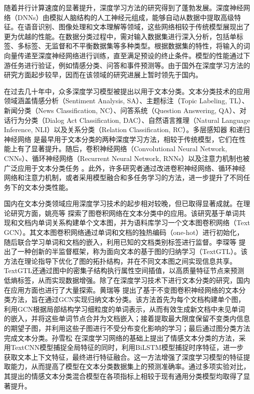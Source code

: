 随着并行计算速度的显著提升，深度学习方法的研究得到了蓬勃发展。深度神经网络（DNNs）由模拟人脑结构的人工神经元组成，能够自动从数据中提取高级特征。在语音识别、图像处理和文本理解等领域，这些网络相较于传统模型展现出了更为优越的性能。在数据分类过程中，需对输入数据集进行深入分析，包括单标签、多标签、无监督和不平衡数据集等多种类型。根据数据集的特性，将输入的词向量传递至深度神经网络进行训练，直至满足预设的终止条件。模型的性能通过下游任务进行验证，例如情感分类、问答和事件预测等。由于国外在深度学习方法的研究方面起步较早，因而在该领域的研究进展上暂时领先于国内。

在过去几十年中，众多深度学习模型被提出以用于文本分类。文本分类技术的应用领域涵盖情感分析（Sentiment Analysis, SA）、主题标注（Topic Labeling, TL）、新闻分类（News Classification, NC）、问答系统（Question Answering, QA）、对话行为分类（Dialog Act Classification, DAC）、自然语言推理（Natural Language Inference, NLI）以及关系分类（Relation Classification, RC）。多层感知器 \cite{Alsmadi2009PerformanceCO} 和递归神经网络 \cite{10.1145/3234150} 是最早用于文本分类的两种深度学习方法，相较于传统模型，它们在性能上有了显著提升。随后，卷积神经网络（Convolutional Neural Network, CNNs）、循环神经网络（Recurrent Neural Network, RNNs）以及注意力机制也被广泛应用于文本分类任务 \cite{Zhao2018InvestigatingCN, Qin2020DCRNetAD, Deng2021HTCInfoMaxAG}。此外，许多研究者通过改进卷积神经网络、循环神经网络和注意力机制，或者采用模型融合和多任务学习的方法，进一步提升了不同任务下的文本分类性能。

国内在文本分类领域应用深度学习技术的起步相对较晚，但已取得显著成就。在理论研究方面，姚亮等 \cite{Yao2018GraphCN} 探索了图卷积网络在文本分类中的应用。该研究基于单词共现和文档内单词关系构建单个文本图，并为语料库学习一个文本图卷积网络（Text GCN）。其文本图卷积网络通过单词和文档的独热编码（one-hot）进行初始化，随后联合学习单词和文档的嵌入，利用已知的文档类别标签进行监督。李琛等 \cite{Li2021TextGTLGT} 提出了一种创新的半监督框架，称为面向文本的基于图的归纳学习（TextGTL）。该方法在理论指导下优化了图的拓扑结构，并在不同文本图之间实现信息共享。TextGTL还通过图中的密集子结构执行属性空间插值，以高质量特征节点来预测低熵标签，从而实现数据增强。除了在深度学习技术下进行文本分类的研究，国内在应用方面也进行了大量探索。黄瑞等 \cite{JSJA2024S1014} 提出了基于不变图卷积神经网络的文本分类方法，旨在通过GCN实现归纳文本分类。该方法首先为每个文档构建单个图，利用GCN根据局部结构学习细粒度的单词表示，从而有效生成新文档中未见单词的嵌入，并将这些单词节点合并为文档嵌入；接着提取最大限度保留不变类内信息的期望子图，并利用这些子图进行不受分布变化影响的学习；最后通过图分类方法完成文本分类。孙雪松 \cite{1024533250.nh} 在深度学习网络的基础上提出了情感文本分类的方法，采用TextCNN模型捕捉全局特征的同时，利用BiLSTM模型捕捉时序特征，进一步获取文本上下文特征，最终进行特征融合。这一方法增强了深度学习模型的特征提取能力，从而提高了模型在文本分类数据集上的预测准确率。通过多项实验对比，其提出的情感文本分类混合模型在各项指标上相较于现有通用分类模型均取得了显著提升。

